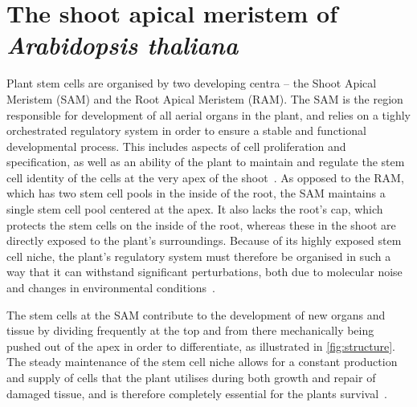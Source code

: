 
\section{The shoot apical meristem of \textit{Arabidopsis thaliana}} %
\label{sec:arabidopsis}
Plant stem cells are organised by two developing centra -- the Shoot Apical
Meristem (SAM) and the Root Apical Meristem (RAM). The SAM is the region
responsible for development of all aerial organs in the plant, and relies on a
tighly orchestrated regulatory system in order to ensure a stable and functional
developmental process. This includes
aspects of cell proliferation and specification, as well as an ability of the plant to
maintain and regulate the stem cell identity of the cells at the very apex of
the shoot~\cite{clark2001cell}. As opposed to the RAM, which has two stem cell pools in the
inside of the root, the SAM maintains a single stem cell pool centered at the
apex. It also lacks the root's cap, which protects the stem cells on the inside
of the root, whereas these in the shoot are directly exposed to the plant's
surroundings. Because of its highly exposed stem cell niche, the plant's
regulatory system must therefore be organised in such a way that it can withstand  
significant perturbations, both due to molecular noise and changes in environmental
conditions~\cite{heidstra2014plant}.

The stem cells at the SAM contribute to the development of new organs and
tissue by dividing frequently at the top and from there 
mechanically being pushed out of the apex in order to differentiate, as
illustrated in \cref{fig:structure}. The steady
maintenance of the stem cell niche allows for a constant production and supply
of cells that the plant utilises during both growth and repair of damaged
tissue, and is therefore completely essential for the plants
survival~\cite{heidstra2014plant}.

